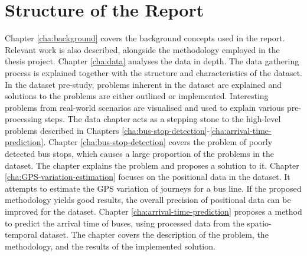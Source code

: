 \section{Structure of the Report}
Chapter \ref{cha:background} covers the background concepts used in the report.
Relevant work is also described, alongside the methodology employed in the thesis project.
Chapter \ref{cha:data} analyses the data in depth.
The data gathering process is explained together with the structure and characteristics of the dataset.
In the dataset pre-study, problems inherent in the dataset are explained and solutions to the problems are either outlined or implemented.
Interesting problems from real-world scenarios are visualised and used to explain various pre-processing steps.
The data chapter acts as a stepping stone to the high-level problems described in Chapters \ref{cha:bus-stop-detection}-\ref{cha:arrival-time-prediction}.
Chapter \ref{cha:bus-stop-detection} covers the problem of poorly detected bus stops, which causes a large proportion of the problems in the dataset.
The chapter explains the problem and proposes a solution to it.
Chapter \ref{cha:GPS-variation-estimation} focuses on the positional data in the dataset.
It attempts to estimate the GPS variation of journeys for a bus line.
If the proposed methodology yields good results, the overall precision of positional data can be improved for the dataset.
Chapter \ref{cha:arrival-time-prediction} proposes a method to predict the arrival time of buses, using processed data from the spatio-temporal dataset.
The chapter covers the description of the problem, the methodology, and the results of the implemented solution.
